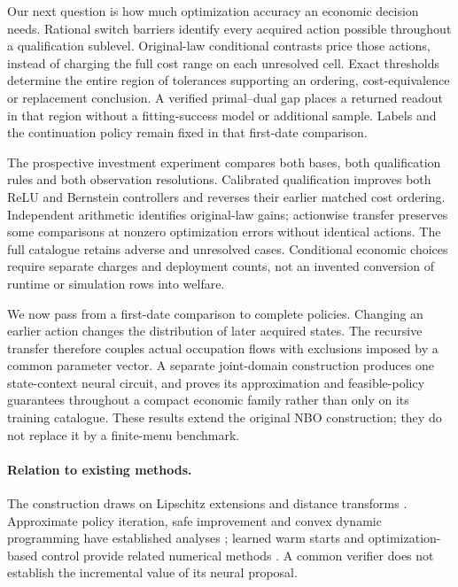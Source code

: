 \documentclass[ecta,nameyear,draft]{econsocart}
\begin{document}
Our next question is how much optimization accuracy an economic decision needs. Rational switch barriers identify every acquired action possible throughout a qualification sublevel. Original-law conditional contrasts price those actions, instead of charging the full cost range on each unresolved cell. Exact thresholds determine the entire region of tolerances supporting an ordering, cost-equivalence or replacement conclusion. A verified primal--dual gap places a returned readout in that region without a fitting-success model or additional sample. Labels and the continuation policy remain fixed in that first-date comparison.

The prospective investment experiment compares both bases, both qualification rules and both observation resolutions. Calibrated qualification improves both ReLU and Bernstein controllers and reverses their earlier matched cost ordering. Independent arithmetic identifies original-law gains; actionwise transfer preserves some comparisons at nonzero optimization errors without identical actions. The full catalogue retains adverse and unresolved cases. Conditional economic choices require separate charges and deployment counts, not an invented conversion of runtime or simulation rows into welfare.

We now pass from a first-date comparison to complete policies. Changing an earlier action changes the distribution of later acquired states. The recursive transfer therefore couples actual occupation flows with exclusions imposed by a common parameter vector. A separate joint-domain construction produces one state-context neural circuit, and proves its approximation and feasible-policy guarantees throughout a compact economic family rather than only on its training catalogue. These results extend the original NBO construction; they do not replace it by a finite-menu benchmark.

\paragraph{Relation to existing methods.}
The construction draws on Lipschitz extensions and distance transforms \citep{mcshane1934,felzenszwalb2012}. Approximate policy iteration, safe improvement and convex dynamic programming have established analyses \citep{munos2003,pirotta2013,scherrer2015,yang2020convex}; learned warm starts and optimization-based control provide related numerical methods \citep{sakaue2023warm,sambharya2023,agrawal2020control}. A common verifier does not establish the incremental value of its neural proposal.
\end{document}
